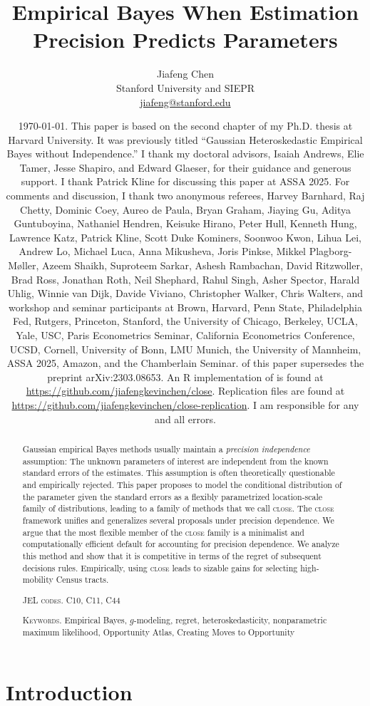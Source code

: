 \documentclass[12pt, reqno]{amsart}
\title{Empirical Bayes When Estimation Precision Predicts Parameters}
\author{Jiafeng Chen \\ Stanford University and SIEPR \\ 
\href{mailto:jiafeng@stanford.edu}
{jiafeng@stanford.edu}}
\date{\today. This paper is based on the second chapter of my Ph.D. thesis at Harvard
 University. It was previously titled ``Gaussian Heteroskedastic Empirical Bayes without
 Independence.'' I thank my doctoral advisors, Isaiah Andrews, Elie Tamer, Jesse Shapiro,
 and Edward Glaeser, for their guidance and generous support. I thank Patrick Kline for
 discussing this paper at ASSA 2025. For comments and discussion, I thank two anonymous
 referees, Harvey Barnhard, Raj Chetty, Dominic Coey, Aureo de Paula, Bryan Graham,
 Jiaying Gu, Aditya Guntuboyina, Nathaniel Hendren, Keisuke Hirano, Peter Hull, Kenneth
 Hung, Lawrence Katz, Patrick Kline, Scott Duke Kominers, Soonwoo Kwon, Lihua Lei, Andrew
 Lo, Michael Luca, Anna Mikusheva, Joris Pinkse, Mikkel Plagborg-M\o {}ller, Azeem
 Shaikh, Suproteem Sarkar, Ashesh Rambachan, David Ritzwoller, Brad Ross, Jonathan Roth,
 Neil Shephard, Rahul Singh, Asher Spector, Harald Uhlig, Winnie van Dijk, Davide
 Viviano, Christopher Walker, Chris Walters,  and workshop and seminar participants at
 Brown, Harvard, Penn State, Philadelphia Fed, Rutgers, Princeton, Stanford, the
 University of Chicago, Berkeley, UCLA, Yale, USC, Paris Econometrics Seminar, California
 Econometrics Conference, UCSD, Cornell, University of Bonn, LMU Munich, the University
 of Mannheim, ASSA 2025, Amazon, and the Chamberlain Seminar. \Cref {asec:max_gauss} of
 this paper supersedes the preprint arXiv:2303.08653. An \textsf {R} implementation of
\close{} is found at \url{https://github.com/jiafengkevinchen/close}.  Replication files
are found at \url{https://github.com/jiafengkevinchen/close-replication}. I am responsible
 for any and all errors. }
\newcommand{\close}{\textsc{close}}
\numberwithin{equation}{section}
\begin{document}
{\onehalfspacing
\begin{abstract}
Gaussian empirical Bayes methods usually maintain a \emph{precision independence}
assumption: The unknown parameters of interest are independent from the known standard errors of the
estimates.
This assumption is often theoretically questionable and empirically rejected. This paper
proposes to model the conditional distribution of the parameter given the standard errors
as a flexibly parametrized location-scale family of distributions, leading to a family of
methods that we call \close. The \close{} framework unifies and generalizes several
proposals under precision dependence. We argue that the most flexible member of
the \close{} family is a minimalist and computationally efficient default for accounting
for precision dependence. We analyze this method and show that it is competitive in terms
of the regret of subsequent decisions rules. 
 Empirically, using \close{} leads to sizable gains for selecting high-mobility Census
 tracts. 



\vspace{1em}
\noindent \textsc{JEL codes.} C10, C11, C44

\noindent \textsc{Keywords.} Empirical Bayes, $g$-modeling, regret, heteroskedasticity,
nonparametric maximum likelihood, Opportunity Atlas, Creating Moves to Opportunity
\end{abstract}

\maketitle
}
\newpage
\onehalfspacing


\section{Introduction}
\end{document}
